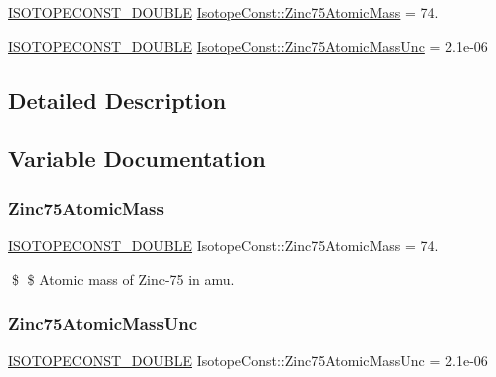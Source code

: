 \begin{DoxyCompactItemize}
\item 
\mbox{\hyperlink{group___isotope_const-_macros_ga8f45a7272ce02c0b4c65c44636ed719a}{I\+S\+O\+T\+O\+P\+E\+C\+O\+N\+S\+T\+\_\+\+D\+O\+U\+B\+LE}} \mbox{\hyperlink{group___isotope_const-_zinc-_zn75_ga3e298f52fd92a3845975cf7877490cae}{Isotope\+Const\+::\+Zinc75\+Atomic\+Mass}} = 74.
\item 
\mbox{\hyperlink{group___isotope_const-_macros_ga8f45a7272ce02c0b4c65c44636ed719a}{I\+S\+O\+T\+O\+P\+E\+C\+O\+N\+S\+T\+\_\+\+D\+O\+U\+B\+LE}} \mbox{\hyperlink{group___isotope_const-_zinc-_zn75_gaea5780c22af579d7038e3d904ece8514}{Isotope\+Const\+::\+Zinc75\+Atomic\+Mass\+Unc}} = 2.\+1e-\/06
\end{DoxyCompactItemize}


\subsection{Detailed Description}


\subsection{Variable Documentation}
\mbox{\label{group___isotope_const-_zinc-_zn75_ga3e298f52fd92a3845975cf7877490cae}} 
\subsubsection{\texorpdfstring{Zinc75\+Atomic\+Mass}{Zinc75AtomicMass}}
{\footnotesize\ttfamily \mbox{\hyperlink{group___isotope_const-_macros_ga8f45a7272ce02c0b4c65c44636ed719a}{I\+S\+O\+T\+O\+P\+E\+C\+O\+N\+S\+T\+\_\+\+D\+O\+U\+B\+LE}} Isotope\+Const\+::\+Zinc75\+Atomic\+Mass = 74.}

\$ \$ Atomic mass of Zinc-\/75 in amu. \mbox{\label{group___isotope_const-_zinc-_zn75_gaea5780c22af579d7038e3d904ece8514}} 
\subsubsection{\texorpdfstring{Zinc75\+Atomic\+Mass\+Unc}{Zinc75AtomicMassUnc}}
{\footnotesize\ttfamily \mbox{\hyperlink{group___isotope_const-_macros_ga8f45a7272ce02c0b4c65c44636ed719a}{I\+S\+O\+T\+O\+P\+E\+C\+O\+N\+S\+T\+\_\+\+D\+O\+U\+B\+LE}} Isotope\+Const\+::\+Zinc75\+Atomic\+Mass\+Unc = 2.\+1e-\/06}

